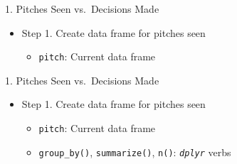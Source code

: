 \begin{frame}[fragile]{1. Pitches Seen vs.~Decisions Made}

\begin{itemize}
\tightlist
\item
  Step 1. Create data frame for pitches seen

  \begin{itemize}
  \tightlist
  \item
    \texttt{pitch}: Current data frame
  \end{itemize}
\end{itemize}

\footnotesize

\begin{Shaded}
\end{Shaded}

\end{frame}

\begin{frame}[fragile]{1. Pitches Seen vs.~Decisions Made}

\begin{itemize}
\tightlist
\item
  Step 1. Create data frame for pitches seen

  \begin{itemize}
  \tightlist
  \item
    \texttt{pitch}: Current data frame
  \item
    \texttt{group\_by()}, \texttt{summarize()}, \texttt{n()}:
    \emph{\texttt{dplyr}} verbs
  \end{itemize}
\end{itemize}

\footnotesize

\begin{Shaded}
\end{Shaded}

\end{frame}

